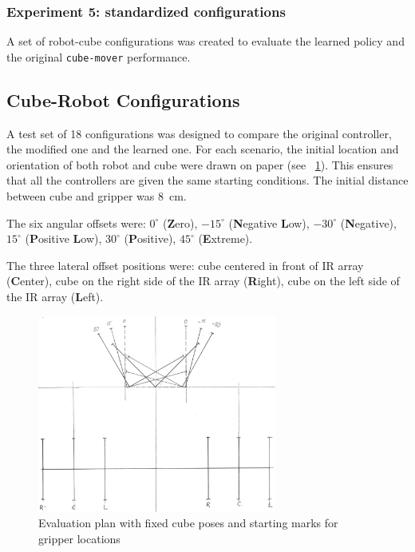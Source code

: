 \subsubsection{Experiment 5: standardized configurations}
A set of robot-cube configurations was created to evaluate the learned policy and the original \texttt{cube-mover} performance. 

\subsection{Cube-Robot Configurations}
A test set of 18 configurations was designed to compare the original controller, the modified one and the learned one. For each scenario, the initial location and orientation of both robot and cube were drawn on paper (see \figurename~\ref{fig:plan}). This ensures that all the controllers are given the same starting conditions. The initial distance between cube and gripper was 8~cm.

The six angular offsets were: $0^\circ$ (\textbf{Z}ero), $-15^\circ$ (\textbf{N}egative \textbf{L}ow), $-30^\circ$ (\textbf{N}egative), $15^\circ$ (\textbf{P}ositive \textbf{L}ow), $30^\circ$ (\textbf{P}ositive), $45^\circ$ (\textbf{E}xtreme).

The three lateral offset positions were: cube centered in front of IR array (\textbf{C}enter), cube on the right side of the IR array (\textbf{R}ight), cube on the left side of the IR array (\textbf{L}eft).

\begin{figure}
	\centering
	\includegraphics[width=0.7\textwidth]{figures/experiment_plan.png}
	\caption{Evaluation plan with fixed cube poses and starting marks for gripper locations}
	\label{fig:plan}
\end{figure}



